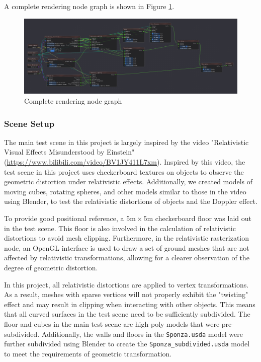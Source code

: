 \documentclass{article}
\begin{document}
A complete rendering node graph is shown in Figure \ref{render}.

\begin{figure}[htbp]
    \centering
    \setlength{\abovecaptionskip}{0.cm}
    \includegraphics[width=\linewidth]{RenderGraph.png}
    \caption{Complete rendering node graph}
    \label{render}
\end{figure}

\subsubsection*{Scene Setup}

The main test scene in this project is largely inspired by the video "Relativistic Visual Effects Misunderstood by Einstein" (\url{https://www.bilibili.com/video/BV1JY411L7xm}). Inspired by this video, the test scene in this project uses checkerboard textures on objects to observe the geometric distortion under relativistic effects. Additionally, we created models of moving cubes, rotating spheres, and other models similar to those in the video using Blender, to test the relativistic distortions of objects and the Doppler effect.

To provide good positional reference, a \(5\text{m} \times 5\text{m}\) checkerboard floor was laid out in the test scene. This floor is also involved in the calculation of relativistic distortions to avoid mesh clipping. Furthermore, in the relativistic rasterization node, an OpenGL interface is used to draw a set of ground meshes that are not affected by relativistic transformations, allowing for a clearer observation of the degree of geometric distortion.

In this project, all relativistic distortions are applied to vertex transformations. As a result, meshes with sparse vertices will not properly exhibit the "twisting" effect and may result in clipping when interacting with other objects. This means that all curved surfaces in the test scene need to be sufficiently subdivided. The floor and cubes in the main test scene are high-poly models that were pre-subdivided. Additionally, the walls and floors in the \lstinline|Sponza.usda| model were further subdivided using Blender to create the \lstinline|Sponza_subdivided.usda| model to meet the requirements of geometric transformation.
\end{document}
